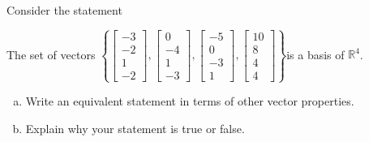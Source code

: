 
\begin{exerciseStatement}


Consider the statement 
\begin{center}\begin{minipage}{0.8\textwidth}
 The set of vectors \( \left\{ \left[\begin{array}{c}
-3 \\
-2 \\
1 \\
-2
\end{array}\right] , \left[\begin{array}{c}
0 \\
-4 \\
1 \\
-3
\end{array}\right] , \left[\begin{array}{c}
-5 \\
0 \\
-3 \\
1
\end{array}\right] , \left[\begin{array}{c}
10 \\
8 \\
4 \\
4
\end{array}\right] \right\} \)is a basis of \(\mathbb{R}^4\). 
\end{minipage}\end{center}
    


\begin{enumerate}[(a)]
\item  Write an equivalent statement in terms of other vector properties.
\item  Explain why your statement is true or false.
\end{enumerate}
    
\end{exerciseStatement}
    
